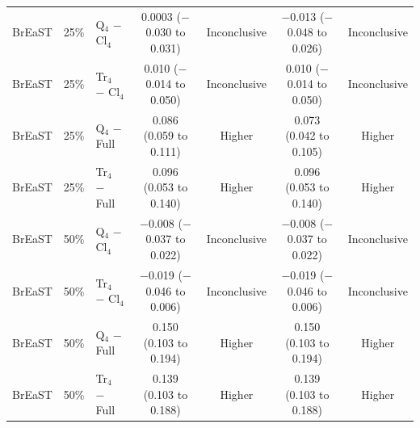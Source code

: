 \begin{longtable}{@{}lrlcccc@{}}
BrEaST & 25\% & Q$_4$ $-$ Cl$_4$ & 0.0003 ($-$0.030 to 0.031) & Inconclusive & $-$0.013 ($-$0.048 to 0.026) & Inconclusive \\
BrEaST & 25\% & Tr$_4$ $-$ Cl$_4$ & 0.010 ($-$0.014 to 0.050) & Inconclusive & 0.010 ($-$0.014 to 0.050) & Inconclusive \\
BrEaST & 25\% & Q$_4$ $-$ Full & 0.086 (0.059 to 0.111) & Higher & 0.073 (0.042 to 0.105) & Higher \\
BrEaST & 25\% & Tr$_4$ $-$ Full & 0.096 (0.053 to 0.140) & Higher & 0.096 (0.053 to 0.140) & Higher \\
BrEaST & 50\% & Q$_4$ $-$ Cl$_4$ & $-$0.008 ($-$0.037 to 0.022) & Inconclusive & $-$0.008 ($-$0.037 to 0.022) & Inconclusive \\
BrEaST & 50\% & Tr$_4$ $-$ Cl$_4$ & $-$0.019 ($-$0.046 to 0.006) & Inconclusive & $-$0.019 ($-$0.046 to 0.006) & Inconclusive \\
BrEaST & 50\% & Q$_4$ $-$ Full & 0.150 (0.103 to 0.194) & Higher & 0.150 (0.103 to 0.194) & Higher \\
BrEaST & 50\% & Tr$_4$ $-$ Full & 0.139 (0.103 to 0.188) & Higher & 0.139 (0.103 to 0.188) & Higher \\
\bottomrule
\end{longtable}
